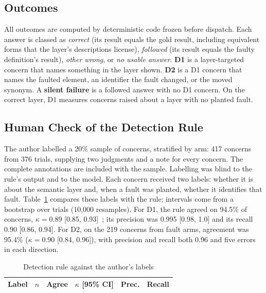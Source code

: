 \documentclass[conference]{IEEEtran}
\begin{document}
\subsection{Outcomes}

All outcomes are computed by deterministic code frozen before dispatch. Each answer is classed as \emph{correct} (its result equals the gold result, including equivalent forms that the layer's descriptions license), \emph{followed} (its result equals the faulty definition's result), \emph{other wrong}, or \emph{no usable answer}. \textbf{D1} is a layer-targeted concern that names something in the layer shown. \textbf{D2} is a D1 concern that names the faulted element, an identifier the fault changed, or the moved synonym. A \textbf{silent failure} is a followed answer with no D1 concern. On the correct layer, D1 measures concerns raised about a layer with no planted fault.

\subsection{Human Check of the Detection Rule}
\label{sec:audit}

The author labelled a 20\% sample of concerns, stratified by arm: 417 concerns from 376 trials, supplying two judgments and a note for every concern. The complete annotations are included with the sample. Labelling was blind to the rule's output and to the model. Each concern received two labels: whether it is about the semantic layer and, when a fault was planted, whether it identifies that fault. Table~\ref{tab:audit} compares these labels with the rule; intervals come from a bootstrap over trials (10,000 resamples). For D1, the rule agreed on 94.5\% of concerns, $\kappa = 0.89$ [0.85, 0.93]~\cite{cohen1960kappa}; its precision was 0.995 [0.98, 1.0] and its recall 0.90 [0.86, 0.94]. For D2, on the 219 concerns from fault arms, agreement was 95.4\% ($\kappa = 0.90$ [0.84, 0.96]), with precision and recall both 0.96 and five errors in each direction.

\begin{table}[t]
\caption{Detection rule against the author's labels}
\label{tab:audit}
\centering
\footnotesize
\setlength{\tabcolsep}{3.5pt}
\begin{tabular}{@{}lrrlrr@{}}
\toprule
Label & $n$ & Agree & $\kappa$ [95\% CI] & Prec. & Recall \\
\midrule

\end{tabular}
\end{table}
\end{document}

